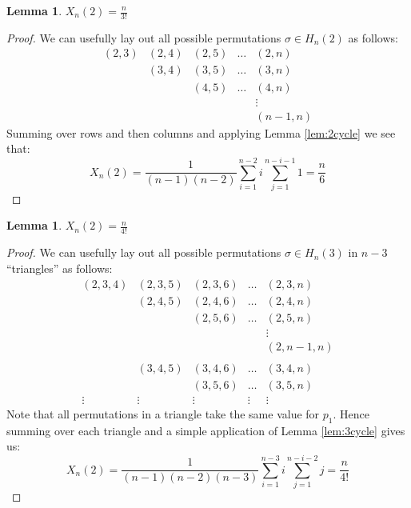 \documentclass[oneside]{book} %
\newtheorem{lem}[thm]{Lemma}
\theoremstyle{definition}
\numberwithin{equation}{section}
\begin{document}
\begin{lem}\label{lem:xn2}
 $X_n(2) = \frac{n}{3!}$
\end{lem}
\begin{proof}
 We can usefully lay out all possible permutations $\sigma \in H_n(2)$ as follows:
  \[ \begin{array}{c|c|c|c|c}
     (2,3)  & (2,4)  & (2,5) & \dots & (2,n) \\
       & (3,4)  & (3,5) & \dots &(3,n) \\
       &        &  (4,5) & \dots & (4,n) \\
       &&&& \vdots \\
       &&&&(n-1,n)
    \end{array} 
\]
Summing over rows and then columns and applying Lemma \ref{lem:2cycle} we see that:
\begin{equation}\label{eqn:tri}
  X_n(2) = \frac{1}{(n-1)(n-2)}\sum_{i=1}^{n-2}i \sum_{j=1}^{n-i-1}1 = \frac{n}{6}
\end{equation}


\end{proof}
\begin{lem}\label{lem:xn3}
 $X_n(2) = \frac{n}{4!}$
\end{lem}
\begin{proof}
 We can usefully lay out all possible permutations $\sigma \in H_n(3)$ in $n-3$ ``triangles'' as follows:
  \[ \begin{array}{c|c|c|c|c}
     (2,3,4)  & (2,3,5)  & (2,3,6) & \dots & (2,3,n) \\
       & (2,4,5)  & (2,4,6) & \dots &(2,4,n) \\
       &        &  (2,5,6) & \dots & (2,5,n) \\
       
       &&&& \vdots \\
       &&&&(2,n-1,n) \\
       &&&& \\
       &(3,4,5) &(3,4,6)&\dots&(3,4,n)\\
       &&(3,5,6)&\dots&(3,5,n)\\
        \vdots & \vdots &  \vdots &  \vdots &  \vdots
    \end{array} 
\]
Note that all permutations in a triangle take the same value for $p_1$. Hence summing over each triangle and a simple application of Lemma \ref{lem:3cycle} gives us:
\begin{equation}\label{eqn:tet}
  X_n(2) = \frac{1}{(n-1)(n-2)(n-3)}\sum_{i=1}^{n-3}i \sum_{j=1}^{n-i-2}j = \frac{n}{4!}
\end{equation}


\end{proof}
\end{document}
